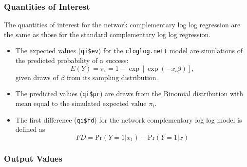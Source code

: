 \subsubsection{Quantities of Interest} 
The quantities of interest for the network complementary log log regression are the same as those for the standard complementary log log regression.  
\begin{itemize} 
\item The expected values ({\tt qi\$ev}) for the {\tt cloglog.nett} model are simulations of the predicted probability of a success:   
\begin{equation*} 
E(Y) = \pi_{i} =  1 - \exp[\exp (-x_i \beta)], 
\end{equation*} 
given draws of $\beta$ from its sampling distribution. 
 
\item The predicted values ({\tt qi\$pr}) are draws from the Binomial distribution with mean equal to the simulated expected value $\pi_{i}$. 
 
\item The first difference ({\tt qi\$fd}) for the network complementary log log model is defined as  
\begin{equation*} 
FD = \text{Pr}(Y = 1 | x_{1}) - \text{Pr}(Y = 1| x) 
\end{equation*} 
\end{itemize} 
 
 
\subsubsection{Output Values} 
 
